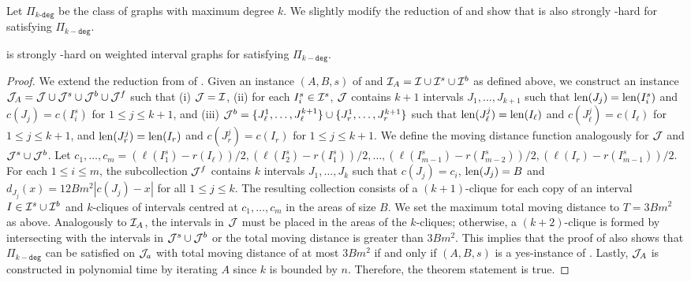 \ifFull
Let $\Pi_{k\texttt{-deg}}$ be the class of graphs with maximum degree $k$. 
We slightly modify the reduction of  and show that {\gged} is also strongly \NP-hard for satisfying $\Pi_{k-\texttt{deg}}$.

\begin{mtheoremrep}\label{thm:ig_nphard_kdeg}
    {\gged} is strongly \NP-hard on weighted interval graphs for satisfying $\Pi_{k-\texttt{deg}}$.
\end{mtheoremrep}
\begin{proof}
    We extend the reduction from {\threepartition} of .
    Given an instance $(A,B,s)$ of {\threepartition} and $\mathcal{I}_A = \mathcal{I} \cup \mathcal{I}^s \cup \mathcal{I}^b$ as defined above, we construct an instance $\mathcal{J}_A = \mathcal{J} \cup \mathcal{J}^s \cup \mathcal{J}^b \cup \mathcal{J}^f$ such that (i) $\mathcal{J} = \mathcal{I}$, (ii) for each $I^s_i \in \mathcal{I}^s$, $\mathcal{J}$ contains $k+1$ intervals $J_1,\ldots,J_{k+1}$ such that $\mathrm{len}(J_j) = \mathrm{len}(I^s_i)$ and $c(J_j) = c(I^s_i)$ for $1\le j \le k+1$, and (iii) $\mathcal{J}^b = \{J_\ell^1,\ldots,J_\ell^{k+1}\}\cup \{J_r^1,\ldots,J_r^{k+1}\}$ such that $\mathrm{len}(J_\ell^j) = \mathrm{len}(I_\ell)$ and $c(J^j_\ell) = c(I_\ell)$ for $1\le j \le k+1$, and $\mathrm{len}(J_r^j) = \mathrm{len}(I_r)$ and $c(J^j_r) = c(I_r)$ for $1\le j \le k+1$.
    We define the moving distance function analogously for $\mathcal{J}$ and $\mathcal{J}^s \cup \mathcal{J}^b$.
    Let $c_1,\ldots,c_m = (\ell(I^s_1)-r(I_\ell))/2,(\ell(I^s_2)-r(I^s_1))/2,\ldots, (\ell(I^s_{m-1})-r(I^s_{m-2}))/2,(\ell(I_r)-r(I^s_{m-1}))/2$.
    For each $1\le i \le m$, the subcollection $\mathcal{J}^f$ contains $k$ intervals $J_1,\ldots,J_k$ such that $c(J_j) = c_i$, $\mathrm{len}(J_j) = B$ and $d_{J_j}(x) = 12Bm^2|c(J_j)-x|$ for all $1\le j \le k$.
    The resulting collection consists of a $(k+1)$-clique for each copy of an interval $I \in \mathcal{I}^s\cup \mathcal{I}^b$ and $k$-cliques of intervals centred at $c_1,\ldots,c_m$ in the areas of size $B$.
    We set the maximum total moving distance to $T = 3Bm^2$ as above.
    Analogously to $\mathcal{I}_A$, the intervals in $\mathcal{J}$ must be placed in the areas of the $k$-cliques; otherwise, a $(k+2)$-clique is formed by intersecting with the intervals in $\mathcal{J}^s \cup \mathcal{J}^b$ or the total moving distance is greater than $3Bm^2$.
    This implies that the proof of  also shows that $\Pi_{k-\texttt{deg}}$ can be satisfied on $\mathcal{J}_a$ with total moving distance of at most $3Bm^2$ if and only if $(A,B,s)$ is a yes-instance of {\threepartition}.
    Lastly, $\mathcal{J}_A$ is constructed in polynomial time by iterating $A$ since $k$ is bounded by $n$.
    Therefore, the theorem statement is true.
\end{proof}

